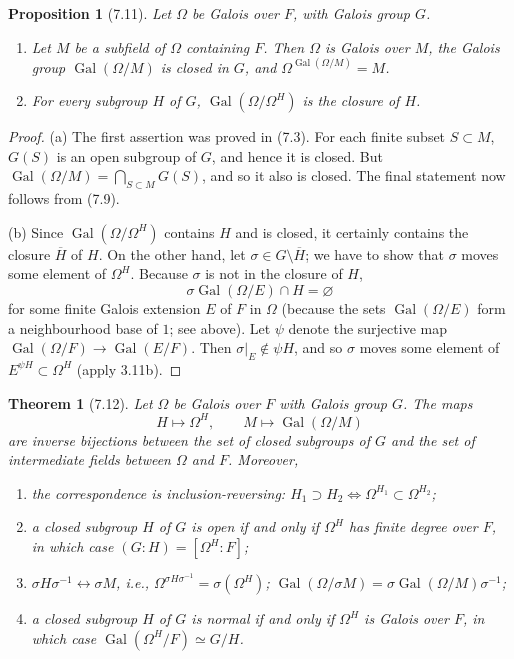 \documentclass[UTF8,11pt]{ctexart}
\newtheorem*{theorem}{Theorem}
\newtheorem*{proposition}{Proposition}
\theoremstyle{definition}
\begin{document}
\begin{proposition}[7.11]
Let $\Omega$ be Galois over $F$, with Galois group $G$.
\begin{enumerate}[label=(\alph*)]
\item Let $M$ be a subfield of $\Omega$ containing $F$. Then $\Omega$ is Galois over $M$, the Galois group $\operatorname{Gal}(\Omega/M)$ is closed in $G$, and $\Omega^{\operatorname{Gal}(\Omega/M)}=M$.
\item For every subgroup $H$ of $G$, $\operatorname{Gal}(\Omega/\Omega^H)$ is the closure of $H$.
\end{enumerate}
\end{proposition}
\begin{proof}
(a) The first assertion was proved in (7.3). For each finite subset $S\subset M$, $G(S)$ is an open subgroup of $G$, and hence it is closed. But $\operatorname{Gal}(\Omega/M)=\bigcap_{S\subset M}G(S)$, and so it also is closed. The final statement now follows from (7.9).

(b) Since $\operatorname{Gal}(\Omega/\Omega^H)$ contains $H$ and is closed, it certainly contains the closure $\overline H$ of $H$. On the other hand, let $\sigma\in G\setminus\overline H$; we have to show that $\sigma$ moves some element of $\Omega^H$. Because $\sigma$ is not in the closure of $H$,
\[
\sigma\operatorname{Gal}(\Omega/E)\cap H=\varnothing
\]
for some finite Galois extension $E$ of $F$ in $\Omega$ (because the sets $\operatorname{Gal}(\Omega/E)$ form a neighbourhood base of $1$; see above). Let $\psi$ denote the surjective map $\operatorname{Gal}(\Omega/F)\to\operatorname{Gal}(E/F)$. Then $\sigma|_E\notin\psi H$, and so $\sigma$ moves some element of $E^{\psi H}\subset\Omega^H$ (apply 3.11b).
\end{proof}
\begin{theorem}[7.12]
Let $\Omega$ be Galois over $F$ with Galois group $G$. The maps
\[
H\longmapsto\Omega^H,\qquad M\longmapsto\operatorname{Gal}(\Omega/M)
\]
are inverse bijections between the set of closed subgroups of $G$ and the set of intermediate fields between $\Omega$ and $F$. Moreover,
\begin{enumerate}[label=(\alph*)]
\item the correspondence is inclusion-reversing: $H_1\supset H_2\Longleftrightarrow\Omega^{H_1}\subset\Omega^{H_2}$;
\item a closed subgroup $H$ of $G$ is open if and only if $\Omega^H$ has finite degree over $F$, in which case $(G:H)=[\Omega^H:F]$;
\item $\sigma H\sigma^{-1}\leftrightarrow\sigma M$, i.e., $\Omega^{\sigma H\sigma^{-1}}=\sigma(\Omega^H)$; $\operatorname{Gal}(\Omega/\sigma M)=\sigma\operatorname{Gal}(\Omega/M)\sigma^{-1}$;
\item a closed subgroup $H$ of $G$ is normal if and only if $\Omega^H$ is Galois over $F$, in which case $\operatorname{Gal}(\Omega^H/F)\simeq G/H$.
\end{enumerate}
\end{theorem}
\end{document}
